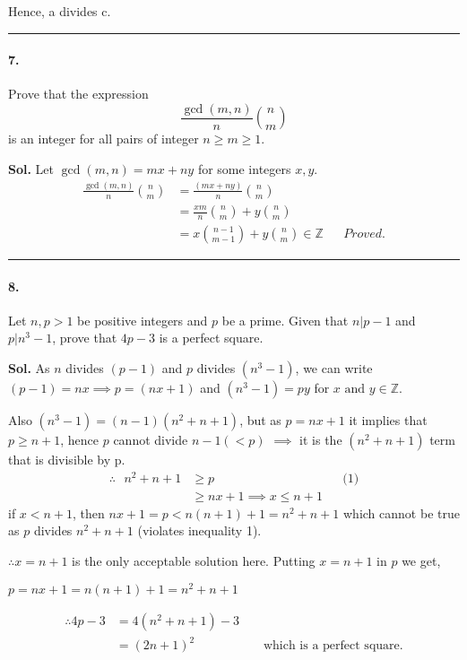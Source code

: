 \documentclass[12pt]{amsart}
\begin{document}
Hence, a divides c.


\par\noindent\textcolor{gray}{\rule{\textwidth}{0.5pt}}
\smallskip

\paragraph*{7.} Prove that the expression 
$$\frac{\gcd{(m, n)}}{n}\binom{n}{m}$$ 
is an integer for all pairs of integer $n \ge m \ge 1$.

\bigskip
\textbf{Sol.}
Let $\gcd{(m, n)} = mx+ny$ for some integers $x, y$.
\begin{align*}
    \frac{\gcd{(m, n)}}{n}\binom{n}{m} &= \frac{(mx+ny)}{n}\binom{n}{m} \\
    &= \frac{xm}{n}\binom{n}{m} + y\binom{n}{m} \\
    &= x\binom{n-1}{m-1} + y\binom{n}{m} \in \mathbb{Z} && Proved.
\end{align*}


\par\noindent\textcolor{gray}{\rule{\textwidth}{0.5pt}}
\smallskip

\paragraph*{8.} Let $ n, p > 1 $ be positive integers and $ p $ be a prime.  Given that $ n|p-1 $ and $ p|n^3-1 $, prove that $ 4p-3 $ is a perfect square.

\bigskip
\textbf{Sol.}
As $n$ divides $(p-1)$ and $p$ divides $(n^3-1)$, we can write $(p-1) = nx \implies p = (nx+1)$ and $(n^3-1) = py$ for $x \text{ and } y \in \mathbb{Z}$.

Also $(n^3-1) = (n-1)(n^2+n+1)$, but as $p=nx+1$ it implies that $p \ge n+1$, hence $p$ cannot divide $n-1  (<p)$ $\implies$ it is the $(n^2+n+1)$ term that is divisible by p.
\begin{align*}
    \therefore \text{ } n^2+n+1 &\ge p && \text{(1)}\\ 
                                &\ge nx+1 
    \implies \boxed{x \le n+1}
\end{align*}
if $x < n+1$, then $nx+1=p < n(n+1) + 1 = n^2+n+1$ which cannot be true as $p$ divides $n^2+n+1$ (violates inequality 1).

$\therefore x=n+1 $ is the only acceptable solution here.
Putting $x=n+1$ in $p$ we get,
\begin{center}
    $p = nx + 1 = n(n+1)+1 = n^2+n+1$   
\end{center}
\begin{align*}
    \therefore 4p-3 &= 4(n^2+n+1) - 3 \\
                    &= (2n+1)^2 && \text{ which is a perfect square.}
\end{align*}
\end{document}
